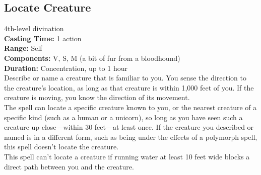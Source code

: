 \documentclass[11pt, A4paper, english]{article}
\begin{document}
		\subsection{Locate Creature}
4th-level divination \\
\textbf{Casting Time:} 1 action \\
\textbf{Range:} Self \\
\textbf{Components:} V, S, M (a bit of fur from a bloodhound) \\
\textbf{Duration:} Concentration, up to 1 hour \\
Describe or name a creature that is familiar to you. You sense the direction to the creature’s location, as long as that creature is within 1,000 feet of you. If the creature is moving, you know the direction of its movement. \\
The spell can locate a specific creature known to you, or the nearest creature of a specific kind (such as a human or a unicorn), so long as you have seen such a creature up close—within 30 feet—at least once. If the creature you described or named is in a different form, such as being under the effects of a polymorph spell, this spell doesn’t locate the creature. \\
This spell can’t locate a creature if running water at least 10 feet wide blocks a direct path between you and the creature.
\end{document}

